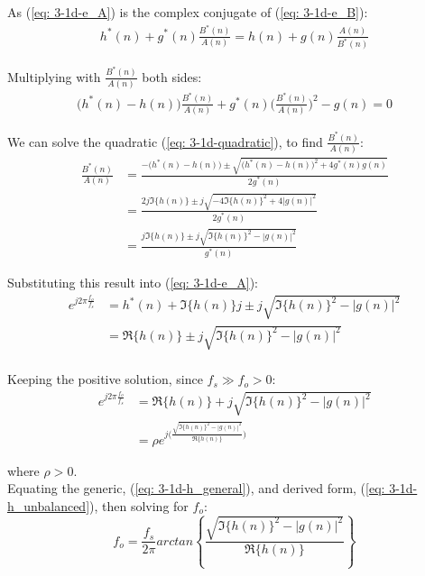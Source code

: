\documentclass[12pt]{article}
\numberwithin{equation}{section}
\begin{document}
			As (\ref{eq: 3-1d-e_A}) is the complex conjugate of (\ref{eq: 3-1d-e_B}):
			\begin{align}
			h^{*}(n) + g^{*}(n) \frac{B^{*}(n)}{A(n)} = h(n) + g(n) \frac{A(n)}{B^{*}(n)}
			\end{align}
			
			Multiplying with $\frac{B^{*}(n)}{A(n)}$ both sides:
			\begin{align}
			\bigg( h^{*}(n) - h(n) \bigg) \frac{B^{*}(n)}{A(n)} + g^{*}(n) \bigg( \frac{B^{*}(n)}{A(n)} \bigg)^{2} - g(n) = 0
			\label{eq: 3-1d-quadratic}
			\end{align}
			
			We can solve the quadratic (\ref{eq: 3-1d-quadratic}), to find $\frac{B^{*}(n)}{A(n)}$:
			\begin{align}
			\frac{B^{*}(n)}{A(n)}   &= \frac{- \bigg( h^{*}(n) - h(n) \bigg) \pm \sqrt{\bigg( h^{*}(n) - h(n) \bigg)^{2} + 4 g^{*}(n) g(n)}}{2g^{*}(n)} \\
			&= \frac{2 j\Im\{h(n)\} \pm j\sqrt{-4 \Im\{h(n)\}^{2} + 4 |g(n)|^{2}}}{2g^{*}(n)} \\
			&= \frac{j\Im\{h(n)\} \pm j\sqrt{\Im\{h(n)\}^{2} - |g(n)|^{2}}}{g^{*}(n)}
			\end{align}
			
			Substituting this result into (\ref{eq: 3-1d-e_A}):
			\begin{align}
			e^{j 2\pi \frac{f_{o}}{f_{s}}}  &= h^{*}(n) + \Im\{h(n)\}j \pm j\sqrt{\Im\{h(n)\}^{2} - |g(n)|^{2}} \\
			&= \Re\{h(n)\} \pm j\sqrt{\Im\{h(n)\}^{2} - |g(n)|^{2}} \\
			\end{align}
			
			Keeping the positive solution, since $f_{s} \gg f_{o} > 0$:
			\begin{align}
			e^{j 2\pi \frac{f_{o}}{f_{s}}}  &= \Re\{h(n)\} + j\sqrt{\Im\{h(n)\}^{2} - |g(n)|^{2}} \\
			&= \rho e^{j\big(\frac{\sqrt{\Im\{h(n)\}^{2} - |g(n)|^{2}}}{\Re\{h(n)\}}\big)} \label{eq: 3-1d-h_unbalanced}
			\end{align}
			
			where $\rho > 0$. \\
			\noindent
			Equating the generic, (\ref{eq: 3-1d-h_general}), and derived form, (\ref{eq: 3-1d-h_unbalanced}), then solving for $f_{o}$:
			\begin{equation}
			f_{o} = \frac{f_{s}}{2 \pi} arctan \left\{\frac{\sqrt{\Im\{h(n)\}^{2} - |g(n)|^{2}}}{\Re\{h(n)\}}\right\}
			\label{eq: 3-1d-fo_ACLMS:proof}
			\end{equation}
\end{document}
